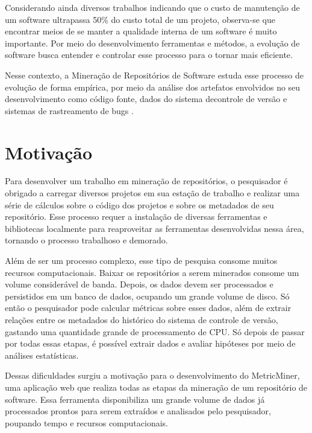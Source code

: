 \documentclass[a4paper, 12pt, twoside]{book}
\begin{document}
        Considerando ainda diversos trabalhos indicando que o custo de manutenção de um software 
        ultrapassa 50\% do custo total de um projeto, observa-se que encontrar meios de se
        manter a qualidade interna de um software é muito importante. Por meio do desenvolvimento 
        ferramentas e métodos, a evolução de software busca entender e controlar esse processo
        para o tornar mais eficiente.
        
        Nesse contexto, a Mineração de Repositórios de Software estuda esse processo de evolução 
        de forma empírica, por meio da análise dos artefatos envolvidos no seu desenvolvimento 
        como código fonte, dados do sistema decontrole de versão e sistemas de rastreamento 
        de bugs \cite{Kagdi:2007}. 

    \section{Motivação}
        Para desenvolver um trabalho em mineração de repositórios, o pesquisador é obrigado a carregar diversos projetos em sua estação de trabalho e realizar uma série de cálculos
        sobre o código dos projetos e sobre os metadados de seu repositório. Esse processo 
        requer a instalação de diversas ferramentas e bibliotecas localmente para reaproveitar
        as ferramentas desenvolvidas nessa área, tornando o processo trabalhoso e demorado.

        Além de ser um processo complexo, esse tipo de pesquisa consome muitos 
        recursos computacionais. Baixar os repositórios a serem minerados consome um volume
        considerável de banda. Depois, os dados devem ser processados e persistidos em um 
        banco de dados, ocupando um grande volume de disco. Só então o pesquisador pode 
        calcular métricas sobre esses dados, além de extrair relações entre os metadados do 
        histórico do sistema de controle de versão, gastando uma quantidade grande de
        processamento de CPU. Só depois de passar por todas essas etapas, é possível extrair
        dados e avaliar hipóteses por meio de análises estatísticas.

        Dessas dificuldades surgiu a motivação para o desenvolvimento do MetricMiner,
        uma aplicação web que realiza todas as etapas da mineração de um repositório de 
        software. Essa ferramenta disponibiliza um grande volume de dados já processados 
        prontos para serem extraídos e analisados pelo pesquisador, poupando tempo e recursos 
        computacionais.
    
\end{document}
